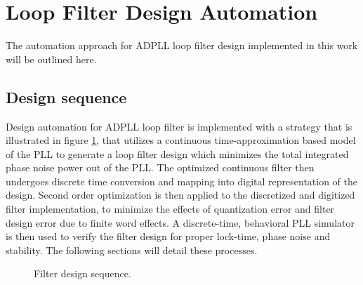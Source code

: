 


\section{Loop Filter Design Automation}\label{methods_lf_design_approach}
The automation approach for ADPLL loop filter design implemented in this work will be outlined here.

\subsection{Design sequence}
	Design automation for ADPLL loop filter is implemented with a strategy that is illustrated in figure \ref{fig:filt_design_seq}, that utilizes a continuous time-approximation based model of the PLL to generate a loop filter design which minimizes the total integrated phase noise power out of the PLL. The optimized continuous filter then undergoes discrete time conversion and mapping into digital representation of the design. Second order optimization is then applied to the discretized and digitized filter implementation, to minimize the effects of quantization error and filter design error due to finite word effects. A discrete-time, behavioral PLL simulator is then used to verify the filter design for proper lock-time, phase noise and stability. The following sections will detail these processes.

	\begin{figure}[htb!]
		\center
		\caption{Filter design sequence.}
		\label{fig:filt_design_seq}
	\end{figure}
	\FloatBarrier

